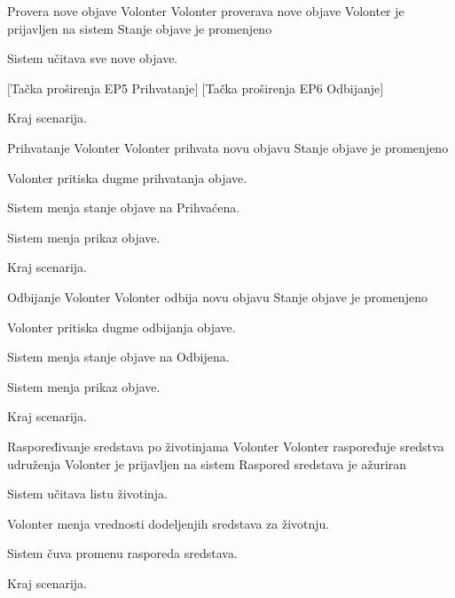         {Provera nove objave}
        {Volonter}
        {Volonter proverava nove objave}
        {Volonter je prijavljen na sistem}
        {Stanje objave je promenjeno}
        {
            \item Sistem učitava sve nove objave.
            \item $[$Tačka proširenja EP5 Prihvatanje$]$ $[$Tačka proširenja EP6 Odbijanje$]$
            \item Kraj scenarija.
        }
        {}
        
        {Prihvatanje}
        {Volonter}
        {Volonter prihvata novu objavu}
        {}
        {Stanje objave je promenjeno}
        {
            \item Volonter pritiska dugme prihvatanja objave.
            \item Sistem menja stanje objave na Prihvaćena.
            \item Sistem menja prikaz objave.
            \item Kraj scenarija.
        }
        {}
        
        {Odbijanje}
        {Volonter}
        {Volonter odbija novu objavu}
        {}
        {Stanje objave je promenjeno}
        {
            \item Volonter pritiska dugme odbijanja objave.
            \item Sistem menja stanje objave na Odbijena.
            \item Sistem menja prikaz objave.
            \item Kraj scenarija.
        }
        {}
        
        {Raspoređivanje sredstava po životinjama}
        {Volonter}
        {Volonter raspoređuje sredstva udruženja}
        {Volonter je prijavljen na sistem}
        {Raspored sredstava je ažuriran}
        {
            \item Sistem učitava listu životinja.
            \item Volonter menja vrednosti dodeljenjih sredstava za životnju.
            \item Sistem čuva promenu rasporeda sredstava.
            \item Kraj scenarija.
        }
        {}
        
